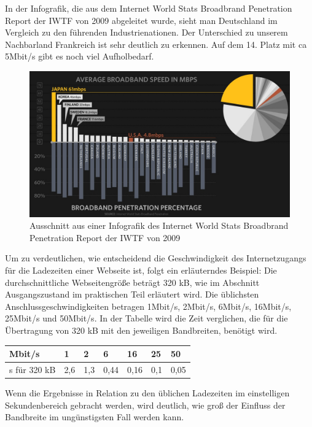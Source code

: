 In der Infografik, die aus dem Internet World Stats Broadbrand Penetration Report der IWTF von 2009 abgeleitet wurde, sieht man Deutschland im Vergleich zu den führenden Industrienationen. Der Unterschied zu unserem Nachbarland Frankreich ist sehr deutlich zu erkennen. Auf dem 14. Platz mit ca 5Mbit/s gibt es noch viel Aufholbedarf.
\begin{figure}[htbp]
  \centering
  \includegraphics[scale=0.5]{material/worldinternetcomp.jpg}
  \caption{Ausschnitt aus einer Infografik des Internet World Stats Broadbrand Penetration Report der IWTF von 2009 }
  \label{fig:iwtfinfo}
\end{figure}
Um zu verdeutlichen, wie entscheidend die Geschwindigkeit des Internetzugangs für die Ladezeiten einer Webseite ist, folgt ein erläuterndes Beispiel:
Die durchschnittliche Webseitengröße beträgt 320 kB, wie im Abschnitt Ausgangszustand im praktischen Teil erläutert wird. Die üblichsten Anschlussgeschwindigkeiten betragen 1Mbit/s, 2Mbit/s, 6Mbit/s, 16Mbit/s, 25Mbit/s und 50Mbit/s. In der Tabelle wird die Zeit verglichen, die für die Übertragung von 320 kB mit den jeweiligen Bandbreiten, benötigt wird.
\begin{center}
    \begin{longtable}{ l | l | l | l | l | l | l}
    \hline
    Mbit/s & 1 & 2 & 6 & 16 & 25 & 50 \\ \hline
    \hline
	s für 320 kB & 2,6 & 1,3 & 0,44 & 0,16 & 0,1 & 0,05 \\ \hline
    \end{longtable}
\end{center}
Wenn die Ergebnisse in Relation zu den üblichen Ladezeiten im einstelligen Sekundenbereich gebracht werden, wird deutlich, wie groß der Einfluss der Bandbreite im ungünstigsten Fall werden kann.

